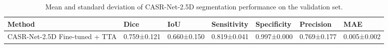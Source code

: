 \begin{table}
\caption{Mean and standard deviation of CASR-Net-2.5D segmentation performance on the validation set.}
\label{tab:casrnet_mean_std}
\begin{tabular}{lllllll}
\toprule
Method & Dice & IoU & Sensitivity & Specificity & Precision & MAE \\
\midrule
CASR-Net-2.5D Fine-tuned + TTA & 0.759±0.121 & 0.660±0.150 & 0.819±0.041 & 0.997±0.000 & 0.769±0.177 & 0.005±0.002 \\
\bottomrule
\end{tabular}
\end{table}
